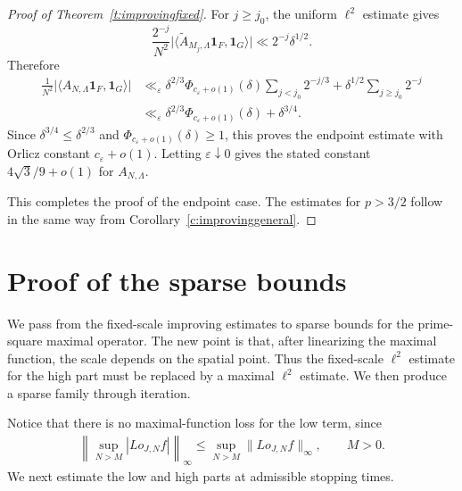\documentclass[12pt,reqno]{amsart}
\numberwithin{equation}{section}
\theoremstyle{definition}
\theoremstyle{remark}
\begin{document}
\begin{proof}[Proof of Theorem~\ref{t:improvingfixed}]
For \(j\geq j_0\), the uniform \(\ell^2\) estimate gives
\[
 \frac{2^{-j}}{N^2}
 \bigl|\langle\widetilde A_{M_j,\Lambda}
 \mathbf1_F,\mathbf1_G\rangle\bigr|
 \ll 2^{-j}\delta^{1/2}.
\]
Therefore
\begin{align*}
 \frac1{N^2}
 \bigl|\langle A_{N,\Lambda}\mathbf1_F,\mathbf1_G\rangle\bigr|
 &\ll_\varepsilon
 \delta^{2/3}\Phi_{c_\varepsilon+o(1)}(\delta)
 \sum_{j<j_0}2^{-j/3}
 +\delta^{1/2}\sum_{j\geq j_0}2^{-j}\\
 &\ll_\varepsilon
 \delta^{2/3}\Phi_{c_\varepsilon+o(1)}(\delta)
 +\delta^{3/4}.
\end{align*}
Since \(\delta^{3/4}\leq\delta^{2/3}\) and
\(\Phi_{c_\varepsilon+o(1)}(\delta)\geq1\), this proves the endpoint
estimate with Orlicz constant \(c_\varepsilon+o(1)\).  Letting
\(\varepsilon\downarrow0\) gives the stated constant
\(4\sqrt3/9+o(1)\) for \(A_{N,\Lambda}\).

This completes the proof of the endpoint case.  The estimates for
\(p>3/2\) follow in the same way from
Corollary~\ref{c:improvinggeneral}.
\end{proof}

\section{Proof of the sparse bounds}
\label{s:sparse}



We pass from the fixed-scale improving estimates to sparse bounds for the
prime-square maximal operator.  The new point is that, after linearizing
the maximal function, the scale depends on the spatial point.  Thus the
fixed-scale \(\ell^2\) estimate for the high part must be replaced by a
maximal \(\ell^2\) estimate.
We
then produce a sparse family through iteration. 


 Notice that
there is no maximal-function loss for the low term, since
\begin{align}\label{e:supLinfty}
 \left\|\sup_{N>M}|Lo_{J,N}f|\right\|_\infty
 \leq \sup_{N>M}\|Lo_{J,N}f\|_\infty , \qquad M>0.
\end{align}
 We next estimate the low and high parts at admissible stopping times.
\end{document}
